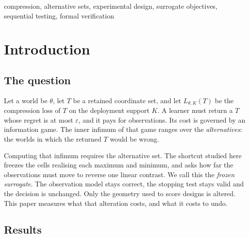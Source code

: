 \begin{IEEEkeywords}
compression, alternative sets, experimental design, surrogate objectives, sequential testing,
formal verification
\end{IEEEkeywords}

\section{Introduction}
\label{sec:intro}

\subsection{The question}

Let a world be $\theta$, let $T$ be a retained coordinate set, and let $L_{\theta,K}(T)$ be the
compression loss of $T$ on the deployment support $K$. A learner must return a $T$ whose
regret is at most $\varepsilon$, and it pays for observations. Its cost is governed by an
information game. The inner infimum of that game ranges over the \emph{alternatives}: the
worlds in which the returned $T$ would be wrong.

Computing that infimum requires the alternative set. The shortcut studied here freezes the cells
realising each maximum and minimum, and asks how far the observations must move to reverse
one linear contrast. We call this the \emph{frozen surrogate}. The observation model stays
correct, the stopping test stays valid and the decision is unchanged. Only the geometry used
to score designs is altered. This paper measures what that alteration costs, and what it
costs to undo.

\subsection{Results}

